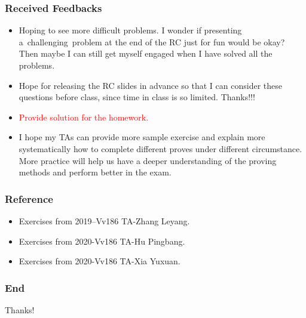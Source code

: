 \documentclass{beamer}
\begin{document}
\begin{frame}
    \frametitle{Received Feedbacks}
    \begin{itemize}
        \item Hoping to see more difficult problems. I wonder if presenting a challenging problem at the end of the RC just for fun would be okay? Then maybe I can still get myself engaged when I have solved all the problems.
        \item Hope for releasing the RC slides in advance so that I can consider these questions before class, since time in class is so limited. Thanks!!!
        \item \textcolor{red}{Provide solution for the homework.}
        \item I hope my TAs can provide more sample exercise and explain more systematically how to complete different proves under different circumstance. 
        More practice will help us have a deeper understanding of the proving methods and perform better in the exam.
    \end{itemize}
\end{frame}
\begin{frame}
    \frametitle{Reference}
    \begin{itemize}
        \item Exercises from 2019–Vv186 TA-Zhang Leyang.
        \item Exercises from 2020-Vv186 TA-Hu Pingbang.
        \item Exercises from 2020-Vv186 TA-Xia Yuxuan.
    \end{itemize}
\end{frame}
\begin{frame}
    \frametitle{End}
    \centering
    \LARGE{Thanks!}
    

\end{frame}
\end{document}
